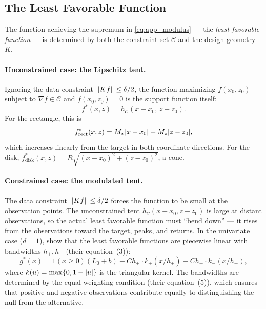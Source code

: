 \subsection{The Least Favorable Function}\label{app:modulus:lff}

The function achieving the supremum in \eqref{eq:app_modulus} --- the \emph{least favorable function} --- is determined by both the constraint set $\mathcal{C}$ and the design geometry $K$.

\paragraph{Unconstrained case: the Lipschitz tent.}
Ignoring the data constraint $\lVert Kf\rVert \leq \delta/2$, the function maximizing $f(x_0, z_0)$ subject to $\nabla f \in \mathcal{C}$ and $f(x_0, z_0) = 0$ is the support function itself:
\begin{equation}\label{eq:app_tent}
	f^*(x, z) = h_{\mathcal{C}}(x - x_0,\, z - z_0).
\end{equation}
For the rectangle, this is
\begin{equation*}
	f^*_{\mathrm{rect}}(x, z) = M_x\lvert x - x_0\rvert + M_z\lvert z - z_0\rvert,
\end{equation*}
which increases linearly from the target in both coordinate directions.
For the disk, $f^*_{\mathrm{disk}}(x, z) = R\sqrt{(x - x_0)^2 + (z - z_0)^2}$, a cone.

\paragraph{Constrained case: the modulated tent.}
The data constraint $\lVert Kf\rVert \leq \delta/2$ forces the function to be small at the observation points.
The unconstrained tent $h_{\mathcal{C}}(x - x_0, z - z_0)$ is large at distant observations, so the actual least favorable function must ``bend down'' --- it rises from the observations toward the target, peaks, and returns.
In the univariate case ($d = 1$), \textcite{armstrong_optimal_2018} show that the least favorable functions are piecewise linear with bandwidths $h_+, h_-$ (their equation~(3)):
\begin{equation*}
	g^*(x) = 1(x \geq 0)(L_0 + b) + C h_+ \cdot k_+(x/h_+) - C h_- \cdot k_-(x/h_-),
\end{equation*}
where $k(u) = \max\{0, 1 - \lvert u\rvert\}$ is the triangular kernel.
The bandwidths are determined by the equal-weighting condition (their equation~(5)), which ensures that positive and negative observations contribute equally to distinguishing the null from the alternative.

